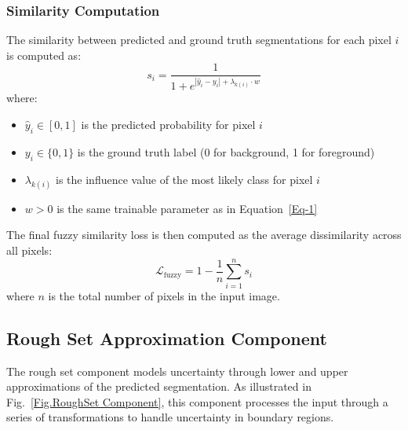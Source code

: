 \documentclass[review]{elsarticle}
\begin{document}
\subsubsection{Similarity Computation}
The similarity between predicted and ground truth segmentations for each pixel $i$ is computed as:
\begin{equation}\label{Eq-4}
    s_i = \frac{1}{1 + e^{|\hat{y}_i - y_i| + \lambda_{k(i)} \cdot w}}
\end{equation}
where:
\begin{itemize}
    \item $\hat{y}_i \in [0,1]$ is the predicted probability for pixel $i$
    \item $y_i \in \{0,1\}$ is the ground truth label (0 for background, 1 for foreground)
    \item $\lambda_{k(i)}$ is the influence value of the most likely class for pixel $i$
    \item $w > 0$ is the same trainable parameter as in Equation~\eqref{Eq-1}
\end{itemize}
The final fuzzy similarity loss is then computed as the average dissimilarity across all pixels:
\begin{equation}\label{Eq-5}
    \mathcal{L}_{\text{fuzzy}} = 1 - \frac{1}{n} \sum_{i=1}^{n} s_i
\end{equation}
where $n$ is the total number of pixels in the input image.

\subsection{Rough Set Approximation Component}
The rough set component models uncertainty through lower and upper approximations of the predicted segmentation. As illustrated in Fig.~\ref{Fig.RoughSet Component}, this component processes the input through a series of transformations to handle uncertainty in boundary regions.
\end{document}
